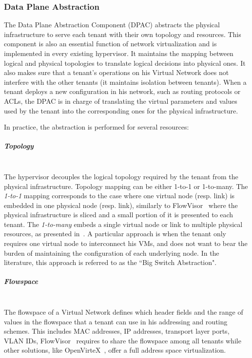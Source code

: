 \subsubsection{Data Plane Abstraction}
\label{sec:abstraction_comp}
The Data Plane Abstraction Component (DPAC) abstracts the physical infrastructure to serve each tenant with their own topology and resources.
This component is also an essential function of network virtualization and is implemented in every existing hypervisor.
It maintains the mapping between logical and physical topologies to translate logical decisions into physical ones.
It also makes sure that a tenant's operations on his Virtual Network does not interfere with the other tenants (\ie it maintains isolation between tenants). When a tenant deploys a new configuration in his network, such as routing protocols or ACLs, the DPAC is in charge of translating the virtual parameters and values used by the tenant into the corresponding ones for the physical infrastructure.

In practice, the abstraction is performed for several resources:

\subparagraph{\textbf{Topology}}\textbf{}\\
The hypervisor decouples the logical topology required by the tenant from the physical infrastructure.
Topology mapping can be either 1-to-1 or 1-to-many. 
The \textsl{1-to-1} mapping corresponds to the case where one virtual node (resp. link) is embedded in one physical node (resp. link), similarly to FlowVisor~\cite{FlowVisor-Sherwood2009} where the physical infrastructure is sliced and a small portion of it is presented to each tenant.
The \textsl{1-to-many} embeds a single virtual node or link to multiple physical resources, as presented in~\cite{OpenVirteX-Al-Shabibi2014,VeRTIGO-Corin2012a}.
A particular approach is when the tenant only requires one virtual node to interconnect his VMs, and does not want to bear the burden of maintaining the configuration of each underlying node. In the literature, this approach is referred to as the ``Big Switch Abstraction".


\subparagraph{\textbf{Flowspace}}\textbf{}\\
The flowspace of a Virtual Network defines which header fields and the range of values in the flowspace that a tenant can use in his addressing and routing schemes. This includes MAC addresses, IP addresses, transport layer ports, VLAN IDs, \etc
FlowVisor~\cite{FlowVisor-Sherwood2009} requires to share the flowspace among all tenants while other solutions, like OpenVirteX~\cite{OpenVirteX-Al-Shabibi2014}, offer a full address space virtualization.

